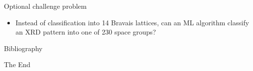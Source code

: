 \documentclass[aspectratio=169]{beamer}
\begin{document}
\begin{frame}{Optional challenge problem}
    \begin{itemize}
        \item Instead of classification into 14 Bravais lattices, can an ML algorithm classify an XRD pattern into one of 230 space groups?
    \end{itemize}
\end{frame}


\begin{frame}{Bibliography}
    
    
\end{frame}


\begin{frame}
    \Huge{\centerline{The End}}
\end{frame}
\end{document}
